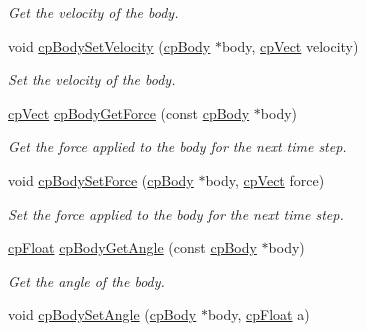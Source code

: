 \begin{DoxyCompactItemize}
\begin{DoxyCompactList}\small\item\em Get the velocity of the body. \end{DoxyCompactList}\item 
\hypertarget{group__cp_body_gaa643cfd0bb8c7c82cb637b187911c7c0}{}void \hyperlink{group__cp_body_gaa643cfd0bb8c7c82cb637b187911c7c0}{cp\+Body\+Set\+Velocity} (\hyperlink{structcp_body}{cp\+Body} $\ast$body, \hyperlink{structcp_vect}{cp\+Vect} velocity)\label{group__cp_body_gaa643cfd0bb8c7c82cb637b187911c7c0}

\begin{DoxyCompactList}\small\item\em Set the velocity of the body. \end{DoxyCompactList}\item 
\hypertarget{group__cp_body_gacac18de04d652df9459bd8acef42e034}{}\hyperlink{structcp_vect}{cp\+Vect} \hyperlink{group__cp_body_gacac18de04d652df9459bd8acef42e034}{cp\+Body\+Get\+Force} (const \hyperlink{structcp_body}{cp\+Body} $\ast$body)\label{group__cp_body_gacac18de04d652df9459bd8acef42e034}

\begin{DoxyCompactList}\small\item\em Get the force applied to the body for the next time step. \end{DoxyCompactList}\item 
\hypertarget{group__cp_body_gaefd640caf57b7cff05f9686a762414c0}{}void \hyperlink{group__cp_body_gaefd640caf57b7cff05f9686a762414c0}{cp\+Body\+Set\+Force} (\hyperlink{structcp_body}{cp\+Body} $\ast$body, \hyperlink{structcp_vect}{cp\+Vect} force)\label{group__cp_body_gaefd640caf57b7cff05f9686a762414c0}

\begin{DoxyCompactList}\small\item\em Set the force applied to the body for the next time step. \end{DoxyCompactList}\item 
\hypertarget{group__cp_body_gafa4c04ec1e94855610e36ce4124997b3}{}\hyperlink{group__basic_types_gac1ed65573e035bf892505768c852d8d3}{cp\+Float} \hyperlink{group__cp_body_gafa4c04ec1e94855610e36ce4124997b3}{cp\+Body\+Get\+Angle} (const \hyperlink{structcp_body}{cp\+Body} $\ast$body)\label{group__cp_body_gafa4c04ec1e94855610e36ce4124997b3}

\begin{DoxyCompactList}\small\item\em Get the angle of the body. \end{DoxyCompactList}\item 
\hypertarget{group__cp_body_ga12b736a5d91e31dba48cadb71111674b}{}void \hyperlink{group__cp_body_ga12b736a5d91e31dba48cadb71111674b}{cp\+Body\+Set\+Angle} (\hyperlink{structcp_body}{cp\+Body} $\ast$body, \hyperlink{group__basic_types_gac1ed65573e035bf892505768c852d8d3}{cp\+Float} a)\label{group__cp_body_ga12b736a5d91e31dba48cadb71111674b}


\end{DoxyCompactItemize}

